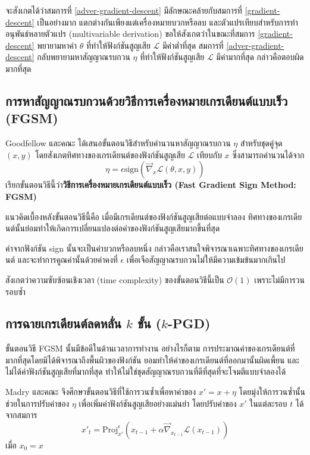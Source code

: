 จะสังเกตได้ว่าสมการที่ \ref{adver-gradient-descent} มีลักษณะคล้ายกับสมการที่ \ref{gradient-descent} เป็นอย่างมาก แตกต่างกันเพียงแต่เครื่องหมายบวกหรือลบ และตัวแปรเทียบสำหรับการทำอนุพันธ์หลายตัวแปร (multivariable derivation) ขอให้สังเกตว่าในขณะที่สมการ \ref{gradient-descent} พยายามหาค่า $\theta$ ที่ทำให้ฟังก์ชันสูญเสีย $\mathscr{L}$ มีค่าต่ำที่สุด สมการที่ \ref{adver-gradient-descent} กลับพยายามหาสัญญาณรบกวน $\eta$ ที่ทำให้ฟังก์ชันสูญเสีย $\mathscr{L}$ มีค่ามากที่สุด กล่าวคือตอบผิดมากที่สุด

\subsection{การหาสัญญาณรบกวนด้วยวิธีการเครื่องหมายเกรเดียนต์แบบเร็ว (FGSM)}

Goodfellow และคณะ \cite{1412.6572} ได้เสนอขั้นตอนวิธีสำหรับคำนวนหาสัญญาณรบกวน $\eta$ สำหรับชุดคู่จุด $(x, y)$ โดยสังเกตทิศทางของเกรเดียนต์ของฟังก์ชันสูญเสีย $\mathscr{L}$ เทียบกับ $x$ ซึ่งสามารถคำนวนได้จาก
\begin{equation}
    \eta = \epsilon \mathrm{sign} \left(\vec{\nabla}_x \mathscr{L}\left(\theta, x, y \right) \right)
\end{equation}
เรียกขั้นตอนวิธีนี้ว่า\textbf{วิธีการเครื่องหมายเกรเดียนต์แบบเร็ว (Fast Gradient Sign Method: FGSM)}

แนวคิดเบื้องหลังขั้นตอนวิธีนี้คือ เมื่อมีเกรเดียนต์ของฟังก์ชันสูญเสียต่อแบบจำลอง ทิศทางของเกรเดียนต์นั้นย่อมทำให้เกิดการเปลี่ยนแปลงต่อค่าของฟังก์ชันสูญเสียมากขึ้นที่สุด 

ค่าจากฟังก์ชัน sign นั้นจะเป็นค่าบวกหรือลบหนึ่ง กล่าวคือเราสนใจพิจารณาเฉพาะทิศทางของเกรเดียนต์ และจะทำการคูณค่านั้นด้วยค่าคงที่ $\epsilon$ เพื่อเจือสัญญาณรบกวนไม่ให้มีความเข้มข้นมากเกินไป

สังเกตว่าความซับซ้อนเชิงเวลา (time complexity) ของขั้นตอนวิธีนี้เป็น $\mathcal{O}(1)$ เพราะไม่มีการวนรอบซ้ำ

\subsection{การฉายเกรเดียนต์ลดหลั่น $k$ ขั้น ($k$-PGD)}

ขั้นตอนวิธี FGSM นั้นมีข้อดีในด้านเวลาการทำงาน อย่างไรก็ตาม การประมาณค่าของเกรเดียนต์ที่มากที่สุดโดยมิได้พิจารณาถึงพื้นผิวของฟังก์ชัน ยอมทำให้ค่าของเกรเดียนต์ที่ออกมานั้นผิดเพี้ยน และไม่ได้ค่าฟังก์ชันสูญเสียที่มากที่สุด ทำให้ไม่ใช่ชุดสัญญาณรบกวนที่ดีที่สุดที่จะโจมตีแบบจำลองได้

Madry และคณะ \cite{aleks2017deep} จึงศึกษาขั้นตอนวิธีที่ใช้การวนซ้ำเพื่อหาค่าของ $x' = x + \eta$ โดยมุ่งให้การวนซ้ำนั้นช่วยในการปรับค่าของ $\eta$ เพื่อเพิ่มค่าฟังก์ชันสูญเสียอย่างแม่นยำ โดยปรับค่าของ $x'$ ในแต่ละรอบ $t$ ได้จากสมการ
\begin{equation}
    x'_t = \text{Proj}_{x'}^\epsilon(x_{t-1} +\alpha \vec{\nabla}_{x_{t-1}}\mathscr{L}(x_{t-1}))
\end{equation}
เมื่อ $x_0 = x$

